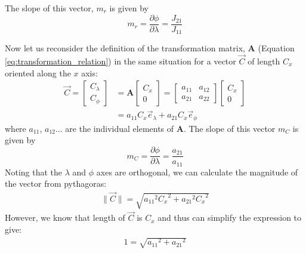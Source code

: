 \documentclass[a4paper,10pt]{article}
\begin{document}
The slope of this vector, $m_r$ is given by
\begin{equation}\label{eq:r_slope}
 m_r = \frac{\partial \phi}{\partial \lambda} = \frac{J_{21}}{J_{11}}
\end{equation}

Now let us reconsider the definition of the transformation matrix, $\mathbf{A}$ (Equation \eqref{eq:transformation_relation}) in the same situation for a vector $\vec C$ of length $C_x$ oriented along the $x$ axis:
\begin{equation}\begin{aligned}\label{}
   \vec C = \left[\begin{matrix}
    C_\lambda \\ C_\phi
   \end{matrix}\right]
  &= \mathbf{A}
   \left[\begin{matrix}
    C_x \\ 0
   \end{matrix}\right] 
   = 
   \left[\begin{matrix}
     a_{11} & a_{12} \\ a_{21} & a_{22}
   \end{matrix}\right] 
   \left[\begin{matrix}
    C_x \\ 0
   \end{matrix}\right] 
\\ &= a_{11} C_x \vec e_\lambda + a_{21} C_x \vec e_\phi
\end{aligned}\end{equation}
where $a_{11}$, $a_{12}$... are the individual elements of $\mathbf{A}$. The slope of this vector $m_C$ is given by
\begin{equation}\label{eq:C_slope}
  m_C = \frac{\partial \phi}{\partial \lambda} = \frac{a_{21}}{a_{11}}
\end{equation}
Noting that the $\lambda$ and $\phi$ axes are orthogonal, we can calculate the magnitude of the vector from pythagoras:
\begin{equation*}\begin{aligned}
   \| \vec C\| = \sqrt{{a_{11}}^2 {C_x}^2 + {a_{21}}^2 {C_x}^2}
\end{aligned}\end{equation*} 
However, we know that length of $\vec C$ is $C_x$ and thus can simplify the expression to give:
\begin{equation}\begin{aligned}\label{eq:C_pythag}
   1  = \sqrt{{a_{11}}^2  + {a_{21}}^2 }
\end{aligned}\end{equation} 
\end{document}
